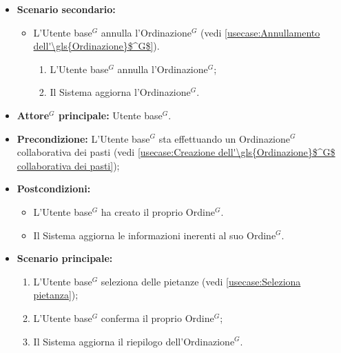 \begin{itemize}
	\item \textbf{Scenario secondario:}
	      \begin{itemize}
		      \item L'\gls{Utente base}$^G$ annulla l'\gls{Ordinazione}$^G$ (vedi
		            \autoref{usecase:Annullamento dell'\gls{Ordinazione}$^G$}).
		            \begin{enumerate}
			            \item L'\gls{Utente base}$^G$ annulla l'\gls{Ordinazione}$^G$;
			            \item Il Sistema aggiorna l'\gls{Ordinazione}$^G$.
		            \end{enumerate}
	      \end{itemize}
\end{itemize}


\label{usecase:Creazione della propria \gls{Ordinazione}$^G$}
\begin{itemize}
	\item \textbf{\gls{Attore}$^G$ principale:} \gls{Utente base}$^G$.

	\item \textbf{Precondizione:} L'\gls{Utente base}$^G$ sta effettuando un \gls{Ordinazione}$^G$ collaborativa dei pasti (vedi \autoref{usecase:Creazione dell'\gls{Ordinazione}$^G$ collaborativa dei pasti});

	\item \textbf{Postcondizioni:}
	      \begin{itemize}
		      \item L'\gls{Utente base}$^G$ ha creato il proprio \gls{Ordine}$^G$.
		      \item Il Sistema aggiorna le informazioni inerenti al suo \gls{Ordine}$^G$.
	      \end{itemize}

	\item \textbf{Scenario principale:}
	      \begin{enumerate}
		      \item L'\gls{Utente base}$^G$ seleziona delle pietanze (vedi \autoref{usecase:Seleziona pietanza});
		      \item L'\gls{Utente base}$^G$ conferma il proprio \gls{Ordine}$^G$;
		      \item Il Sistema aggiorna il riepilogo dell'\gls{Ordinazione}$^G$.
	      \end{enumerate}
\end{itemize}


